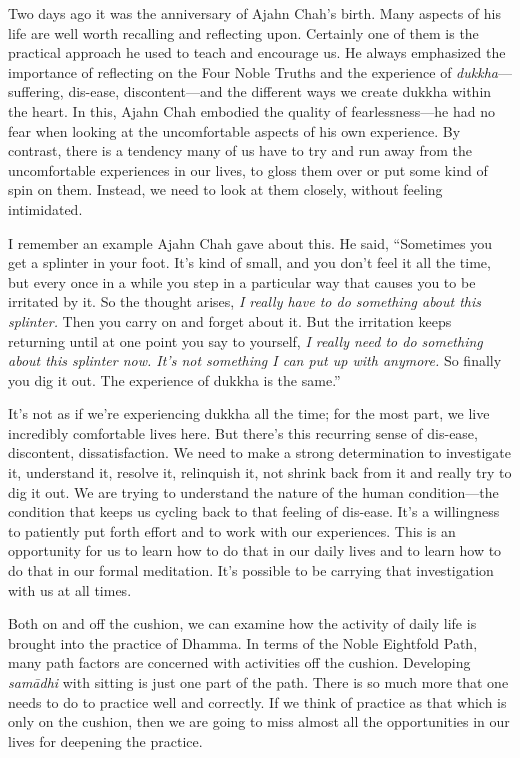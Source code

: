 
Two days ago it was the anniversary of Ajahn Chah's birth. Many aspects 
of his life are well worth recalling and reflecting upon. Certainly one 
of them is the practical approach he used to teach and encourage us. He 
always emphasized the importance of reflecting on the Four Noble Truths 
and the experience of \emph{dukkha}---suffering, dis-ease, 
discontent---and the different ways we create dukkha within the heart. 
In this, Ajahn Chah embodied the quality of fearlessness---he had no 
fear when looking at the uncomfortable aspects of his own experience. 
By contrast, there is a tendency many of us have to try and run away 
from the uncomfortable experiences in our lives, to gloss them over or 
put some kind of spin on them. Instead, we need to look at them 
closely, without feeling intimidated.

I remember an example Ajahn Chah gave about this. He said, ``Sometimes 
you get a splinter in your foot. It's kind of small, and you don't feel 
it all the time, but every once in a while you step in a particular way 
that causes you to be irritated by it. So the thought arises, \emph{I 
really have to do something about this splinter.} Then you carry on and 
forget about it. But the irritation keeps returning until at one point 
you say to yourself, \emph{I really need to do something about this 
splinter now. It's not something I can put up with anymore.} So finally 
you dig it out. The experience of dukkha is the same.''

It's not as if we're experiencing dukkha all the time; for the most 
part, we live incredibly comfortable lives here. But there's this 
recurring sense of dis-ease, discontent, dissatisfaction. We need to 
make a strong determination to investigate it, understand it, resolve 
it, relinquish it, not shrink back from it and really try to dig it 
out. We are trying to understand the nature of the human 
condition---the condition that keeps us cycling back to that feeling of 
dis-ease. It's a willingness to patiently put forth effort and to work 
with our experiences. This is an opportunity for us to learn how to do 
that in our daily lives and to learn how to do that in our formal 
meditation. It's possible to be carrying that investigation with us at 
all times.


Both on and off the cushion, we can examine how the activity of daily 
life is brought into the practice of Dhamma. In terms of the Noble 
Eightfold Path, many path factors are concerned with activities off the 
cushion. Developing \emph{samādhi} with sitting is just one part of 
the path. There is so much more that one needs to do to practice well 
and correctly. If we think of practice as that which is only on the 
cushion, then we are going to miss almost all the opportunities in our 
lives for deepening the practice.

